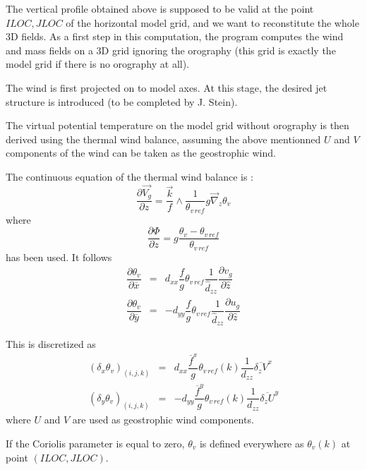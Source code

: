 The vertical profile obtained above is supposed to be valid at the point
$ILOC,JLOC$ of the horizontal model grid, and we want to reconstitute the
whole 3D fields.  As a first step in this computation, the program computes
the wind and mass fields on a 3D grid ignoring the orography (this grid is
exactly the model grid if there is no orography at all).

The wind is first projected on to model axes. At this stage,
the desired jet structure is introduced (to be completed by J. Stein).

The virtual potential temperature on the model grid without
orography is then derived using the thermal wind balance, assuming the above
mentionned
$U$ and $V$ components of the wind can be taken as the geostrophic wind.

The continuous equation of the thermal wind balance is :
\begin{equation}
\dfrac{\partial \vec{V_{g}}}{\partial z} =
\dfrac{\vec{k}}{f} \wedge \dfrac{1}{\theta_{v\,ref}} g \vec{\nabla}_{z}
\theta_{v}
\end{equation}
where
\begin{equation}
\dfrac{\partial \Phi}{\partial z} = g \dfrac{ \theta_v - \theta_{v\,ref} }
{\theta_{v\,ref} }
\end{equation}
has been used. It follows
\begin{eqnarray}
\dfrac{\partial \theta_{v} }{\partial \overline{x}} & = &
d_{xx} \dfrac{f}{g}  \theta_{v\,ref}
\dfrac{1}{\widehat{d}_{zz}} \dfrac{\partial v_{g} }{\partial \widehat{z}}
\\
\dfrac{\partial \theta_{v} }{\partial \overline{y}} &  = & - d_{yy}
\dfrac{f}{g} \theta_{v\,ref}
\dfrac{1}{\widehat{d}_{zz}} \dfrac{\partial u_{g} }{\partial \widehat{z}}
\end{eqnarray}

This is discretized as
\begin{eqnarray}
\left( \delta _{x} \theta_{v}\right)_{(i,j,k)} & = & d_{xx}
 \dfrac{\overline{f}^x}{g}
\theta_{v\,ref}(k) \dfrac{1}{d_{zz}} \overline{\delta_{z} V}^x  \\
\left( \delta _{y} \theta_{v}\right)_{(i,j,k)} & = & - d_{yy}
 \dfrac{\overline{f}^y}{g}
\theta_{v\,ref}(k) \dfrac{1}{d_{zz}} \overline{\delta_{z} U }^y
\end{eqnarray}
where $U$ and $V$ are used as geostrophic wind components.

If the Coriolis parameter is equal to zero, $\theta_{v}$ is defined everywhere
as $\theta_{v}(k)$ at point $(ILOC,JLOC)$.

